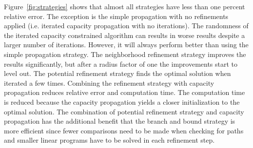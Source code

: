 \documentclass[twoside,11pt]{article}
\begin{document}
Figure~\ref{fig:strategies} shows that almost all strategies have less than one
percent relative error. The exception is the simple propagation with no
refinements applied (i.e. iterated capacity propagation with no iterations).
The randomness of the iterated capacity constrained algorithm can results in worse
results despite a larger number of iterations. However, it will always perform better than
using the simple propagation strategy.  The neighborhood refinement strategy
improves the results significantly, but after a radius factor of one the improvements start to
level out.  The potential refinement strategy finds the optimal solution when
iterated a few times.  Combining the refinement strategy with capacity
propagation reduces relative error and computation time.  The computation time
is reduced because the capacity propagation yields a closer initialization to
the optimal solution. The combination of potential refinement strategy and capacity propagation has
the additional benefit that the branch and bound strategy is more efficient
since fewer comparisons need to be made when checking for paths and smaller
linear programs have to be solved in each refinement step.
\end{document}
